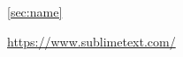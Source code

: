 \documentclass[12pt]{article}
\newcommand\"{quote}
\begin{document}
\ref{sec:name}

\cite{my:bib:key}


\cite[\command]{my:bib:key}
%

\parencite[Proposition~1]{Ref}

\parencites[Proposition~1]{Firstref}[p.~2]{SecondRef}




\url{https://www.sublimetext.com/}

\href{https://www.sublimetext.com/}





\end{document}
